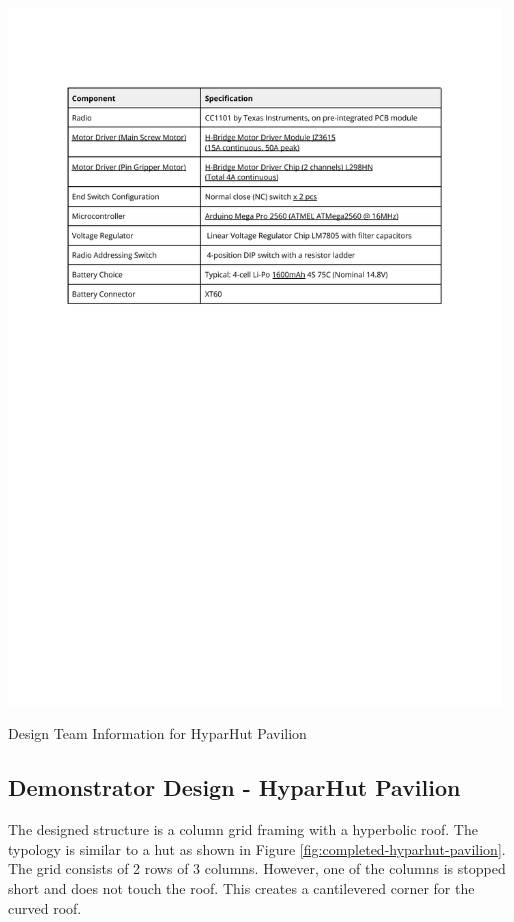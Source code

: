 \begin{table}[!h]
    \includegraphics[page=3, trim=25.4mm 190mm 25.4mm 33mm, clip, width=0.98\textwidth]{tables/Tables in Chapter 7.pdf}
    \caption{Design Team Information for HyparHut Pavilion}
    \label{table:design-and-team-information-for-hyparhut-pavilion}
\end{table}

\FloatBarrier

\subsection{Demonstrator Design  - HyparHut Pavilion}
\label{subsection:exploration-4-demonstrator-design-hyparhut-pavilion}

The designed structure is a column grid framing with a hyperbolic roof. The typology is similar to a hut as shown in Figure \ref{fig:completed-hyparhut-pavilion}. The grid consists of 2 rows of 3 columns. However, one of the columns is stopped short and does not touch the roof. This creates a cantilevered corner for the curved roof.


